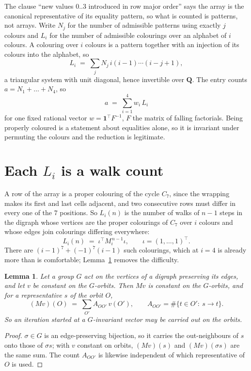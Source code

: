 \documentclass[11pt,a4paper]{article}
\theoremstyle{plain}
\newtheorem{lemma}[theorem]{Lemma}
\theoremstyle{definition}
\begin{document}
The clause ``new values $0..3$ introduced in row major order'' says the array is the
canonical representative of its equality pattern, so what is counted is patterns, not arrays.
Write $N_j$ for the number of admissible patterns using exactly $j$ colours and $L_i$ for the
number of admissible colourings over an alphabet of $i$ colours. A colouring over $i$ colours
is a pattern together with an injection of its colours into the alphabet, so
\[
L_i\;=\;\sum_j N_j\,i(i-1)\cdots(i-j+1),
\]
a triangular system with unit diagonal, hence invertible over $\mathbf{Q}$. The entry counts
$a=N_1+\dots+N_{4}$, so
\[
a\;=\;\sum_{i=1}^{4}w_i\,L_i
\]
for one fixed rational vector $w=\mathbf{1}^{\!\top}F^{-1}$, $F$ the matrix of falling
factorials. Being properly coloured is a statement about equalities alone, so it is invariant
under permuting the colours and the reduction is legitimate.

\section{Each $L_i$ is a walk count}

A row of the array is a proper colouring of the cycle $C_{7}$, since the wrapping makes
its first and last cells adjacent, and two consecutive rows must differ in every one of the
$7$ positions. So $L_i(n)$ is the number of walks of $n-1$ steps in the digraph whose
vertices are the proper colourings of $C_{7}$ over $i$ colours and whose edges join
colourings differing everywhere:
\[
L_i(n)\;=\;\iota^{\!\top}M_i^{\,n-1}\iota ,\qquad \iota=(1,\dots,1)^{\!\top} .
\]
There are $(i-1)^{7}+(-1)^{7}(i-1)$ such colourings, which at $i=4$ is already more
than is comfortable; Lemma~\ref{lem:lump} removes the difficulty.

\begin{lemma}\label{lem:lump}
Let a group $G$ act on the vertices of a digraph preserving its edges, and let $v$ be constant
on the $G$-orbits. Then $Mv$ is constant on the $G$-orbits, and for a representative $s$ of
the orbit $O$,
\[
(Mv)(O)\;=\;\sum_{O'}A_{OO'}\,v(O'),\qquad
A_{OO'}=\#\{t\in O':\ s\to t\} .
\]
So an iteration started at a $G$-invariant vector may be carried out on the orbits.
\end{lemma}

\begin{proof}
$\sigma\in G$ is an edge-preserving bijection, so it carries the out-neighbours of $s$ onto
those of $\sigma s$; with $v$ constant on orbits, $(Mv)(s)$ and $(Mv)(\sigma s)$ are the same
sum. The count $A_{OO'}$ is likewise independent of which representative of $O$ is used.
\end{proof}
\end{document}
